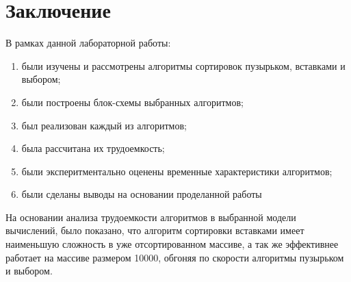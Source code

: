 \documentclass[a4paper,12pt]{report}
\begin{document}
	\chapter*{Заключение}
	
	В рамках данной лабораторной работы:
	
	\begin{enumerate}
		\item были изучены и рассмотрены алгоритмы сортировок пузырьком, вставками и выбором;
		\item были построены блок-схемы выбранных алгоритмов;
		\item был реализован каждый из алгоритмов;
		\item была рассчитана их трудоемкость;
		\item были эксперитментально оценены временные характеристики алгоритмов;
		\item были сделаны выводы на основании проделанной работы
	\end{enumerate}
	
	На основании анализа трудоемкости алгоритмов в выбранной модели вычислений, было показано, что алгоритм сортировки вставками имеет наименьшую сложность в уже отсортированном массиве, а так же эффективнее работает на массиве размером 10000, обгоняя по скорости алгоритмы пузырьком и выбором.
	
	
	
%	
	
\end{document}
